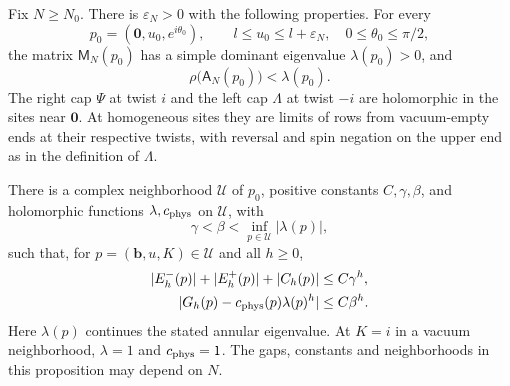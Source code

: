 \begin{proposition}\label{prop:fixed-N-cap-estimate}
Fix \(N\ge N_0\). There is \(\varepsilon_N>0\) with the following properties. For every
\[
 p_0=(\mathbf0,u_0,e^{i\theta_0}),\qquad
 l\le u_0\le l+\varepsilon_N,\quad 0\le\theta_0\le\pi/2,
\]
the matrix \(\mathsf M_N(p_0)\) has a simple dominant eigenvalue \(\lambda(p_0)>0\), and
\[
 \rho\bigl(\mathsf A_N(p_0)\bigr)<\lambda(p_0).
\]
The right cap \(\Psi\) at twist \(i\) and the left cap \(\Lambda\) at twist \(-i\) are holomorphic in the sites near \(\mathbf0\). At homogeneous sites they are limits of rows from vacuum-empty ends at their respective twists, with reversal and spin negation on the upper end as in the definition of \(\Lambda\).

There is a complex neighborhood \(\mathcal U\) of \(p_0\), positive constants \(C,\gamma,\beta\), and holomorphic functions \(\lambda,c_{\rm phys}\) on \(\mathcal U\), with
\[
 \gamma<\beta<\inf_{p\in\mathcal U}|\lambda(p)|,
\]
such that, for \(p=(\mathbf b,u,K)\in\mathcal U\) and all \(h\ge0\),
\begin{equation}\label{eq:fixed-N-cap-bounds}
 \begin{aligned}
 |E^-_h(p)|+|E^+_h(p)|+|C_h(p)|&\le C\gamma^h,\\
 |G_h(p)-c_{\rm phys}(p)\lambda(p)^h|&\le C\beta^h.
 \end{aligned}
\end{equation}
Here \(\lambda(p)\) continues the stated annular eigenvalue. At \(K=i\) in a vacuum neighborhood, \(\lambda=1\) and \(c_{\rm phys}=1\). The gaps, constants and neighborhoods in this proposition may depend on \(N\).
\end{proposition}

